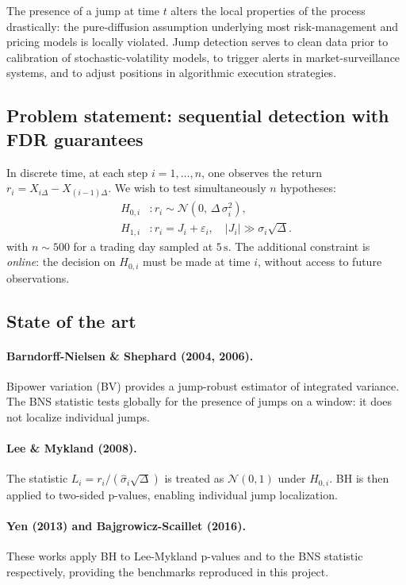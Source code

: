 \documentclass[11pt,a4paper,twocolumn]{article}
\theoremstyle{plain}
\theoremstyle{definition}
\theoremstyle{remark}
\newcommand{\dt}{\Delta}
\newcommand{\shat}{\hat{\sigma}}
\begin{document}
The presence of a jump at time $t$ alters the local properties of the process
drastically: the pure-diffusion assumption underlying most risk-management and
pricing models is locally violated. Jump detection serves to clean data prior
to calibration of stochastic-volatility models, to trigger alerts in
market-surveillance systems, and to adjust positions in algorithmic execution
strategies.

\subsection{Problem statement: sequential detection with FDR guarantees}

In discrete time, at each step $i = 1, \ldots, n$, one observes the return
$r_i = X_{i\dt} - X_{(i-1)\dt}$. We wish to test simultaneously $n$ hypotheses:
\begin{align}
  H_{0,i} &: r_i \sim \mathcal{N}(0,\, \dt\,\sigma_i^2),\nonumber\\
  H_{1,i} &: r_i = J_i + \varepsilon_i,\quad |J_i| \gg \sigma_i\sqrt{\dt}.
\end{align}
with $n \sim 500$ for a trading day sampled at $5\,\mathrm{s}$. The additional
constraint is \emph{online}: the decision on $H_{0,i}$ must be made at time
$i$, without access to future observations.

\subsection{State of the art}

\paragraph{Barndorff-Nielsen \& Shephard (2004, 2006).}
Bipower variation (BV) provides a jump-robust estimator of integrated
variance. The BNS statistic tests globally for the presence of jumps on a
window: it does not localize individual jumps.

\paragraph{Lee \& Mykland (2008).}
The statistic $L_i = r_i / (\shat_i \sqrt{\dt})$ is treated as $\mathcal{N}(0,1)$
under $H_{0,i}$. BH \cite{BH1995} is then applied to two-sided p-values,
enabling individual jump localization.

\paragraph{Yen (2013) and Bajgrowicz-Scaillet (2016).}
These works apply BH to Lee-Mykland p-values and to the BNS statistic
respectively, providing the benchmarks reproduced in this project.
\end{document}
